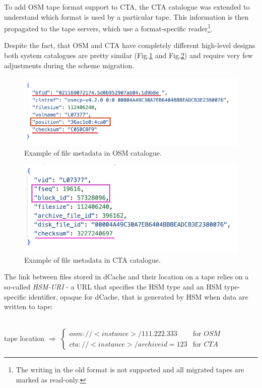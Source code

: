 \documentclass{webofc}
\begin{document}
To add OSM tape format support to CTA, the CTA catalogue was extended to understand 
which format is used by a particular tape. This information is then propagated to the tape servers, which use a format-specific reader\footnote{The writing in the old format is not supported and all migrated tapes are marked as read-only.}.

Despite the fact, that OSM and CTA have completely different high-level designs both system catalogues are pretty similar (Fig.\ref{fig:osm_entry_example} and Fig.\ref{fig:cta_entry_example}) and require very few adjustments during the scheme migration.

\begin{figure}[h]
    \centering
    \includegraphics[scale=0.60]{osm-schema.png}
    \caption{Example of file metadata in OSM catalogue.}
    \label{fig:osm_entry_example}
\end{figure}

\begin{figure}[h]
    \centering
    \includegraphics[scale=0.60]{cta-schema.png}
    \caption{Example of file metadata in CTA catalogue.}
    \label{fig:cta_entry_example}
\end{figure}

The link between files stored in dCache and their location on a tape relies on a so-called \textit{HSM-URI} - a URL that specifies the HSM type and an HSM type-specific identifier, opaque for dCache, that is generated by HSM when data are written to tape:

~\\
tape location $\Rightarrow$ $\begin{cases}
    osm://<instance>/111.222.333 &\text{for } OSM \\
    cta://<instance>/archiveid=123 &\text{for } CTA
\end{cases}$
~\\
\end{document}

